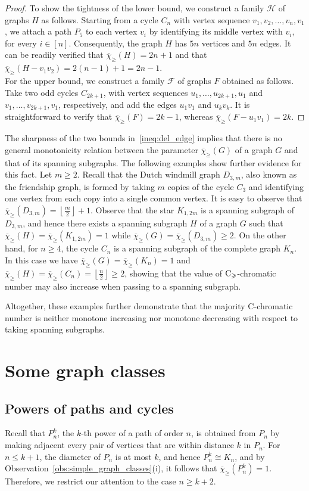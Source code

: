 \documentclass{article}
\theoremstyle{definition}
\newcommand{\mc}{\overline{\chi}_{\geqslant}}
\newcommand{\cg}{{\rm C}_{\geqslant}}
\begin{document}
\begin{proof}
To show the tightness of the lower bound, we construct a family $\mathcal{H}$ of graphs $H$ as follows.
Starting from a cycle $C_n$ with vertex sequence
$v_1,v_2,\ldots,v_n,v_1$, we attach a path $P_5$ to each vertex $v_i$ by identifying its middle vertex with $v_i$, for every $i \in [n]$.
Consequently, the graph $H$ has $5n$ vertices and $5n$ edges. It can be readily verified that $\mc(H)=2n+1$ and that $\mc(H - v_1v_2)=2(n-1)+1=2n-1$.
\\For the upper bound, we construct a family $\mathcal{F}$ of graphs $F$ obtained as follows.
Take two odd cycles $C_{2k+1}$, with vertex sequences
$u_1,\dots,u_{2k+1},u_1$ and $v_1,\dots,v_{2k+1},v_1$,
respectively, and add the edges $u_1v_1$ and $u_kv_k$.
It is straightforward to verify that $\mc(F)=2k-1$,
whereas $\mc(F - u_1v_1)=2k$.
\end{proof}

The sharpness of the two bounds in~\eqref{ineq:del_edge} implies that there is no general monotonicity relation between the parameter $\mc(G)$ of a graph $G$ and that of its spanning subgraphs. The following examples show further evidence for this fact.
Let $m\ge 2$. Recall that the Dutch windmill graph $D_{3,m}$, also
known as the friendship graph,  is formed by taking $m$ copies of the cycle $C_3$ and identifying one vertex from each copy into a single common vertex.
It is easy to observe that $\mc(D_{3,m})=\left\lfloor \frac{m}{2} \right\rfloor +1.$
Observe that the star $K_{1,2m}$ is a spanning subgraph of
$D_{3,m}$, and hence there exists a spanning subgraph $H$ of a graph
$G$ such that
$\mc(H)=\mc(K_{1,2m})=1$
 while $\mc(G)=\mc(D_{3,m})\ge 2$. On the other hand, for $n\ge 4$, the cycle $C_n$ is a spanning
subgraph of the complete graph $K_n$. In this case we have
$\mc(G)=\mc(K_n)=1$
and $
\mc(H)=\mc(C_n)= \left\lfloor \frac{n}{2} \right\rfloor \ge 2$, showing that the value of $\cg$-chromatic number may also increase when passing to a spanning subgraph. 

Altogether, these examples further demonstrate that the majority C-chromatic number is neither monotone increasing nor monotone decreasing with respect
to taking spanning subgraphs.

\section{Some graph classes}\label{sec:graph_classes}
    
\subsection{Powers of paths and cycles}
Recall that $P_n^k$, the $k$-th power of a path of order $n$, is obtained from $P_n$ by making adjacent every pair of vertices that are within distance $k$ in $P_n$. For $n \leq k+1$, the diameter of $P_n$ is at most $k$, and hence $P_n^k \cong K_n$, and by Observation~\ref{obs:simple_graph_classes}(i), it follows that $\mc(P_n^k)=1$. Therefore, we restrict our attention to the case $n \ge k+2$.
\end{document}
